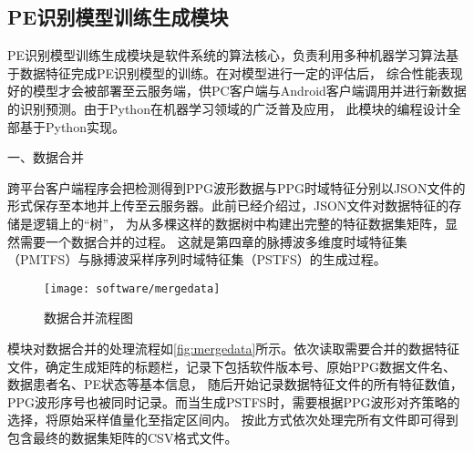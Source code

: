
\subsection{PE识别模型训练生成模块}
PE识别模型训练生成模块是软件系统的算法核心，负责利用多种机器学习算法基于数据特征完成PE识别模型的训练。在对模型进行一定的评估后，
综合性能表现好的模型才会被部署至云服务端，供PC客户端与Android客户端调用并进行新数据的识别预测。由于Python在机器学习领域的广泛普及应用，
此模块的编程设计全部基于Python实现。

一、数据合并

跨平台客户端程序会把检测得到PPG波形数据与PPG时域特征分别以JSON文件的形式保存至本地并上传至云服务器。此前已经介绍过，JSON文件对数据特征的存储是逻辑上的“树”，
为从多棵这样的数据树中构建出完整的特征数据集矩阵，显然需要一个数据合并的过程。
这就是第四章的脉搏波多维度时域特征集（PMTFS）与脉搏波采样序列时域特征集（PSTFS）的生成过程。
\begin{figure}[htbp]
    \centering
    \texttt{[image: software/mergedata]}
    \caption{\label{fig:mergedata}数据合并流程图}
\end{figure}

模块对数据合并的处理流程如\autoref{fig:mergedata}所示。依次读取需要合并的数据特征文件，确定生成矩阵的标题栏，记录下包括软件版本号、原始PPG数据文件名、数据患者名、PE状态等基本信息，
随后开始记录数据特征文件的所有特征数值，PPG波形序号也被同时记录。而当生成PSTFS时，需要根据PPG波形对齐策略的选择，将原始采样值量化至指定区间内。
按此方式依次处理完所有文件即可得到包含最终的数据集矩阵的CSV格式文件。

